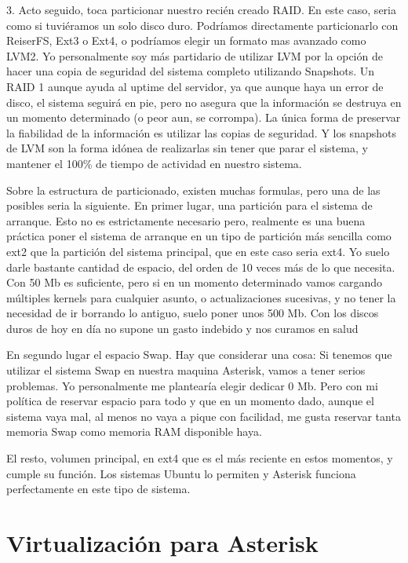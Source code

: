 3. Acto seguido, toca particionar nuestro recién creado RAID. En este caso, seria como si tuviéramos un solo disco duro. Podríamos directamente particionarlo con ReiserFS, Ext3 o Ext4, o podríamos elegir un formato mas avanzado como LVM2. Yo personalmente soy más partidario de utilizar LVM por la opción de hacer una copia de seguridad del sistema completo utilizando Snapshots. Un RAID 1 aunque ayuda al uptime del servidor, ya que aunque haya un error de disco, el sistema seguirá en pie, pero no asegura que la información se destruya en un momento determinado (o peor aun, se corrompa). La única forma de preservar la fiabilidad de la información es utilizar las copias de seguridad. Y los snapshots de LVM son la forma idónea de realizarlas sin tener que parar el sistema, y mantener el 100\% de tiempo de actividad en nuestro sistema.

Sobre la estructura de particionado, existen muchas formulas, pero una de las posibles seria la siguiente. En primer lugar, una partición para el sistema de arranque. Esto no es estrictamente necesario pero, realmente es una buena práctica poner el sistema de arranque en un tipo de partición más sencilla como ext2 que la partición del sistema principal, que en este caso seria ext4. Yo suelo darle bastante cantidad de espacio, del orden de 10 veces más de lo que necesita. Con 50 Mb es suficiente, pero si en un momento determinado vamos cargando múltiples kernels para cualquier asunto, o actualizaciones sucesivas, y no tener la necesidad de ir borrando lo antiguo, suelo poner unos 500 Mb. Con los discos duros de hoy en día no supone un gasto indebido y nos curamos en salud

En segundo lugar el espacio Swap. Hay que considerar una cosa: Si tenemos que utilizar el sistema Swap en nuestra maquina Asterisk, vamos a tener serios problemas. Yo personalmente me plantearía elegir dedicar 0 Mb. Pero con mi política de reservar espacio para todo y que en un momento dado, aunque el sistema vaya mal, al menos no vaya a pique con facilidad, me gusta reservar tanta memoria Swap como memoria RAM disponible haya.

El resto, volumen principal, en ext4 que es el más reciente en estos momentos, y cumple su función. Los sistemas Ubuntu lo permiten y Asterisk funciona perfectamente en este tipo de sistema.

\section{Virtualización para Asterisk}

